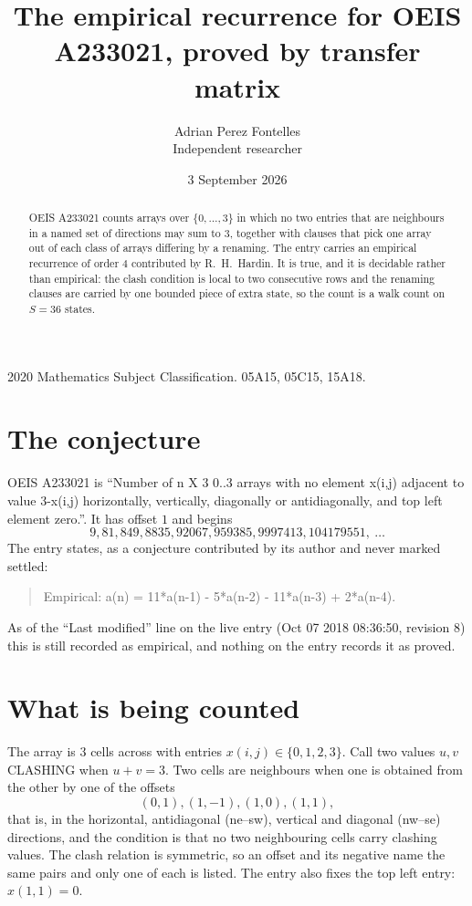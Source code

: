 \documentclass[11pt,a4paper]{article}
\title{The empirical recurrence for OEIS A233021, proved by transfer matrix}
\author{Adrian Perez Fontelles\\ \small Independent researcher}
\date{3 September 2026}
\theoremstyle{plain}
\theoremstyle{definition}
\begin{document}
\maketitle

\begin{abstract}
OEIS A233021 counts arrays over $\{0,\dots,3\}$ in which no two entries that are neighbours in
a named set of directions may sum to $3$, together with clauses that pick one array out of
each class of arrays differing by a renaming. The entry carries an empirical recurrence of
order $4$ contributed by R.~H.~Hardin. It is true, and it is decidable rather than
empirical: the clash condition is local to two consecutive rows and the renaming clauses are
carried by one bounded piece of extra state, so the count is a walk count on $S=36$ states.
\end{abstract}

\noindent\small 2020 Mathematics Subject Classification. 05A15, 05C15, 15A18.\normalsize

\section{The conjecture}

OEIS A233021 is ``Number of n X 3 0..3 arrays with no element x(i,j) adjacent to value 3-x(i,j) horizontally, vertically, diagonally or antidiagonally, and top left element zero.''. It has offset $1$ and begins
\[
9, 81, 849, 8835, 92067, 959385, 9997413, 104179551,\ \dots
\]
The entry states, as a conjecture contributed by its author and never marked settled:
\begin{quote}
Empirical: a(n) = 11*a(n-1) - 5*a(n-2) - 11*a(n-3) + 2*a(n-4).
\end{quote}
As of the ``Last modified'' line on the live entry (Oct 07 2018 08:36:50, revision 8) this is still
recorded as empirical, and nothing on the entry records it as proved.

\section{What is being counted}

The array is $3$ cells across with entries $x(i,j)\in\{0,1,2,3\}$. Call two values $u,v$ CLASHING
when $u+v=3$. Two cells are neighbours when one is obtained from the other by one of
the offsets
\[
(0,1), (1,-1), (1,0), (1,1),
\]
that is, in the horizontal, antidiagonal (ne--sw), vertical and diagonal (nw--se) directions, and the condition is that no two neighbouring cells carry
clashing values. The clash relation is symmetric, so an offset and its negative name the
same pairs and only one of each is listed. The entry also fixes the top left entry: $x(1,1)=0$.
\end{document}
